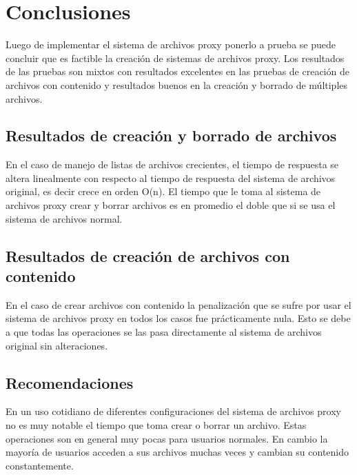 \def\baselinestretch{1}
\chapter{Conclusiones}
\ifpdf
    \graphicspath{{Conclusions/ConclusionsFigs/PNG/}{Conclusions/ConclusionsFigs/PDF/}{Conclusions/ConclusionsFigs/}}
\else
    \graphicspath{{Conclusions/ConclusionsFigs/EPS/}{Conclusions/ConclusionsFigs/}}
\fi

Luego de implementar el sistema de archivos proxy ponerlo a prueba se puede concluir que es factible la creación de sistemas de archivos proxy. Los resultados de las pruebas son mixtos con resultados excelentes en las pruebas de creación de archivos con contenido y resultados buenos en la creación y borrado de múltiples archivos.

\section{Resultados de creación y borrado de archivos}

En el caso de manejo de listas de archivos crecientes, el tiempo de respuesta se altera linealmente con respecto al tiempo de respuesta del sistema de archivos original, es decir crece en orden O(n). El tiempo que le toma al sistema de archivos proxy crear y borrar archivos es en promedio el doble que si se usa el sistema de archivos normal.

\section{Resultados de creación de archivos con contenido}

En el caso de crear archivos con contenido la penalización que se sufre por usar el sistema de archivos proxy en todos los casos fue prácticamente nula. Esto se debe a que todas las operaciones se las pasa directamente al sistema de archivos original sin alteraciones.

\section{Recomendaciones}

En un uso cotidiano de diferentes configuraciones del sistema de archivos proxy no es muy notable el tiempo que toma crear o borrar un archivo. Estas operaciones son en general muy pocas para usuarios normales. En cambio la mayoría de usuarios acceden a sus archivos muchas veces y cambian su contenido constantemente. 

